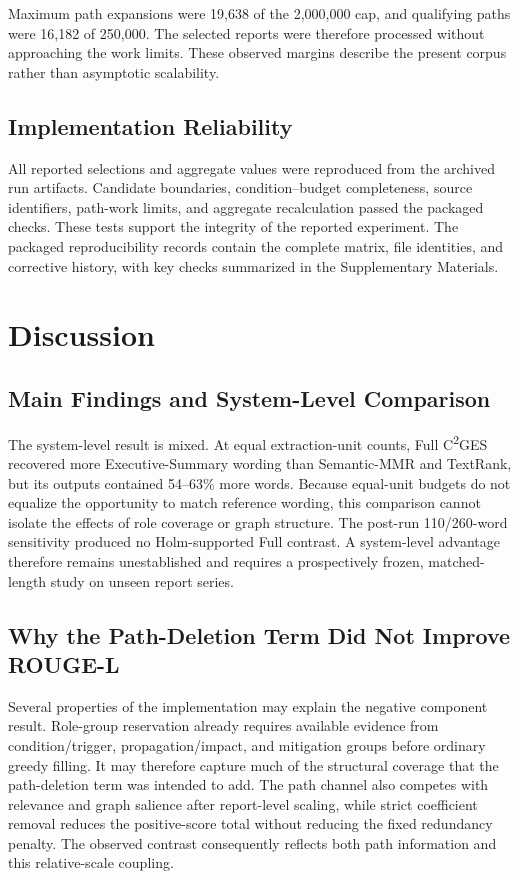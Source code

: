 \documentclass[applsci,article,submit,moreauthors]{Definitions/mdpi}
\newcommand{\cges}{C\textsuperscript{2}GES}
\begin{document}
Maximum path expansions were 19,638 of the 2,000,000 cap, and qualifying paths were 16,182 of 250,000. The selected reports were therefore processed without approaching the work limits. These observed margins describe the present corpus rather than asymptotic scalability.

\subsection{Implementation Reliability}

All reported selections and aggregate values were reproduced from the archived run artifacts. Candidate boundaries, condition--budget completeness, source identifiers, path-work limits, and aggregate recalculation passed the packaged checks. These tests support the integrity of the reported experiment. The packaged reproducibility records contain the complete matrix, file identities, and corrective history, with key checks summarized in the Supplementary Materials.

\section{Discussion}

\subsection{Main Findings and System-Level Comparison}

The system-level result is mixed. At equal extraction-unit counts, Full \cges{} recovered more Executive-Summary wording than Semantic-MMR and TextRank, but its outputs contained 54--63\% more words. Because equal-unit budgets do not equalize the opportunity to match reference wording, this comparison cannot isolate the effects of role coverage or graph structure. The post-run 110/260-word sensitivity produced no Holm-supported Full contrast. A system-level advantage therefore remains unestablished and requires a prospectively frozen, matched-length study on unseen report series.

\subsection{Why the Path-Deletion Term Did Not Improve ROUGE-L}

Several properties of the implementation may explain the negative component result. Role-group reservation already requires available evidence from condition/trigger, propagation/impact, and mitigation groups before ordinary greedy filling. It may therefore capture much of the structural coverage that the path-deletion term was intended to add. The path channel also competes with relevance and graph salience after report-level scaling, while strict coefficient removal reduces the positive-score total without reducing the fixed redundancy penalty. The observed contrast consequently reflects both path information and this relative-scale coupling.
\end{document}

